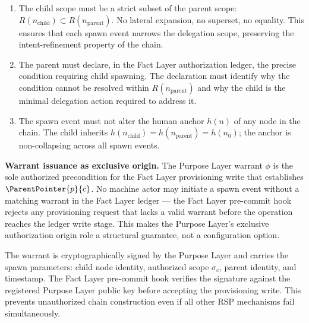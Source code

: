 \documentclass[12pt]{article}
\begin{document}
\begin{enumerate}
    \item[(S1) \textbf{Scope refinement.}] The child scope must be a strict subset of the parent scope: $R(n_{\mathrm{child}}) \subset R(n_{\mathrm{parent}})$. No lateral expansion, no superset, no equality. This ensures that each spawn event narrows the delegation scope, preserving the intent-refinement property of the chain.

    \item[(S2) \textbf{Operational necessity.}] The parent must declare, in the Fact Layer authorization ledger, the precise condition requiring child spawning. The declaration must identify why the condition cannot be resolved within $R(n_{\mathrm{parent}})$ and why the child is the minimal delegation action required to address it.

    \item[(S3) \textbf{Human anchor consistency.}] The spawn event must not alter the human anchor $h(n)$ of any node in the chain. The child inherits $h(n_{\mathrm{child}}) = h(n_{\mathrm{parent}}) = h(n_0)$; the anchor is non-collapsing across all spawn events.
\end{enumerate}

\medskip
\noindent\textbf{Warrant issuance as exclusive origin.} The Purpose Layer warrant $\phi$ is the sole authorized precondition for the Fact Layer provisioning write that establishes $\ParentPointer{p}{c}$. No machine actor may initiate a spawn event without a matching warrant in the Fact Layer ledger — the Fact Layer pre-commit hook rejects any provisioning request that lacks a valid warrant before the operation reaches the ledger write stage. This makes the Purpose Layer's exclusive authorization origin role a structural guarantee, not a configuration option.

The warrant is cryptographically signed by the Purpose Layer and carries the spawn parameters: child node identity, authorized scope $\sigma_c$, parent identity, and timestamp. The Fact Layer pre-commit hook verifies the signature against the registered Purpose Layer public key before accepting the provisioning write. This prevents unauthorized chain construction even if all other RSP mechanisms fail simultaneously.
\end{document}
